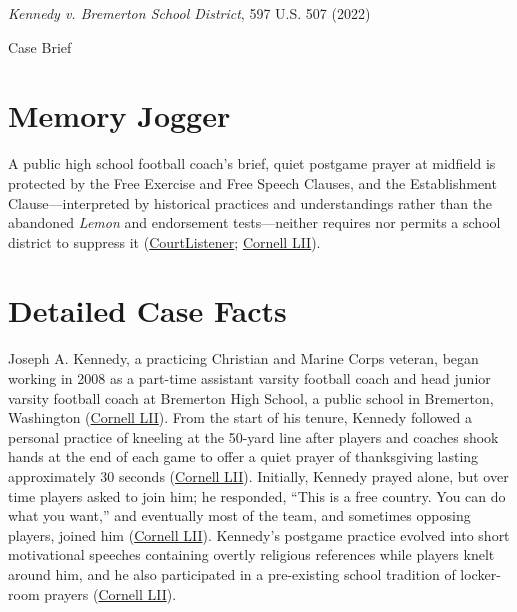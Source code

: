 \documentclass[12pt]{article}
\begin{document}
\begin{center}
{\LARGE \textit{Kennedy v. Bremerton School District}, 597 U.S. 507 (2022)\par}
\vspace{0.8em}
{\large Case Brief\par}
\end{center}
\vspace{1em}

\section{Memory Jogger}
A public high school football coach's brief, quiet postgame prayer at midfield is protected by the Free Exercise and Free Speech Clauses, and the Establishment Clause---interpreted by historical practices and understandings rather than the abandoned \textit{Lemon} and endorsement tests---neither requires nor permits a school district to suppress it (\href{https://www.courtlistener.com/opinion/6619004/kennedy-v-bremerton-school-dist/}{CourtListener}; \href{https://www.law.cornell.edu/supremecourt/text/21-418}{Cornell LII}).

\section{Detailed Case Facts}
Joseph A. Kennedy, a practicing Christian and Marine Corps veteran, began working in 2008 as a part-time assistant varsity football coach and head junior varsity football coach at Bremerton High School, a public school in Bremerton, Washington (\href{https://www.law.cornell.edu/supremecourt/text/21-418}{Cornell LII}). From the start of his tenure, Kennedy followed a personal practice of kneeling at the 50-yard line after players and coaches shook hands at the end of each game to offer a quiet prayer of thanksgiving lasting approximately 30 seconds (\href{https://www.law.cornell.edu/supremecourt/text/21-418}{Cornell LII}). Initially, Kennedy prayed alone, but over time players asked to join him; he responded, ``This is a free country. You can do what you want,'' and eventually most of the team, and sometimes opposing players, joined him (\href{https://www.law.cornell.edu/supremecourt/text/21-418}{Cornell LII}). Kennedy's postgame practice evolved into short motivational speeches containing overtly religious references while players knelt around him, and he also participated in a pre-existing school tradition of locker-room prayers (\href{https://www.law.cornell.edu/supremecourt/text/21-418}{Cornell LII}).
\end{document}
